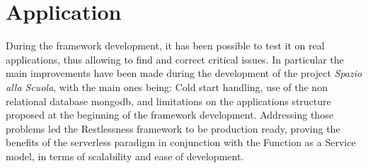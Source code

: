 \documentclass{article}
\begin{document}
\section{Application}
During the framework development, it has been possible to test it on real applications,
thus allowing to find and correct critical issues. In particular the main improvements
have been made during the development of the project \textit{Spazio alla Scuola},
with the main ones being: Cold start handling, use of the non relational database
mongodb, and limitations on the applications structure proposed at the beginning
of the framework development. Addressing those problems led the Restlessness
framework to be production ready, proving the benefits of the serverless paradigm
in conjunction with the Function as a Service model, in terms of scalability and
ease of development.
\end{document}
